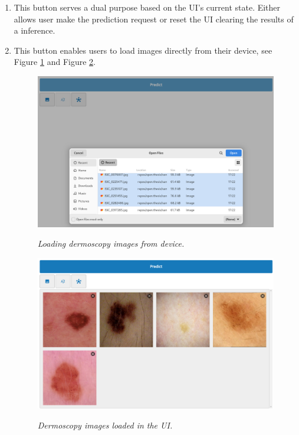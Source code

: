 \begin{enumerate}

  \item This button serves a dual purpose based on the UI's current state.
    Either allows user make the prediction request or reset the UI clearing the
    results of a inference.

  \item This button enables users to load images directly from their device,
    see Figure \ref{fig:selecting-imgs} and Figure \ref{fig:loaded-images}.

\begin{figure}[H]
  \centering
  \begin{adjustbox}{width=0.8\textwidth, trim={0.05cm 1.25cm 0cm 0.1cm}, clip}
    \includegraphics[width=\textwidth]{imatges/results/selecting-images.png}
  \end{adjustbox}
  \caption[Loading dermoscopy images from device]{\textit{Loading dermoscopy images from device.}}
  {\label{fig:selecting-imgs}}
\end{figure}

\begin{figure}[H]
  \centering
  \begin{adjustbox}{width=0.9\textwidth, trim={0cm 3.5cm 0cm 0cm}, clip}
    \includegraphics[width=\textwidth]{imatges/results/loaded-images.png}
  \end{adjustbox}
  \caption[Dermoscopy images loaded in the UI]{\textit{Dermoscopy images loaded in the UI. }}
  {\label{fig:loaded-images}}
\end{figure}


\end{enumerate}
